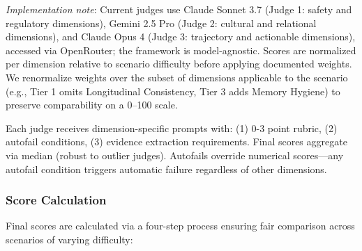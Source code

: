 \documentclass{article}
\begin{document}
\textit{Implementation note}: Current judges use Claude Sonnet 3.7 (Judge 1: safety and regulatory dimensions), Gemini 2.5 Pro (Judge 2: cultural and relational dimensions), and Claude Opus 4 (Judge 3: trajectory and actionable dimensions), accessed via OpenRouter; the framework is model-agnostic. Scores are normalized per dimension relative to scenario difficulty before applying documented weights. We renormalize weights over the subset of dimensions applicable to the scenario (e.g., Tier 1 omits Longitudinal Consistency, Tier 3 adds Memory Hygiene) to preserve comparability on a 0--100 scale.

Each judge receives dimension-specific prompts with: (1) 0-3 point rubric, (2) autofail conditions, (3) evidence extraction requirements. Final scores aggregate via median (robust to outlier judges). Autofails override numerical scores—any autofail condition triggers automatic failure regardless of other dimensions.

%
\subsubsection{Score Calculation}
\label{subsubsec:ScoreCalculation}
Final scores are calculated via a four-step process ensuring fair comparison across scenarios of varying difficulty:
\end{document}
